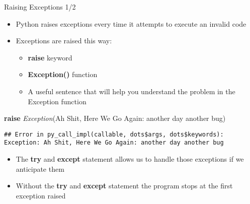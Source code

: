 \documentclass[
  8pt,
  ignorenonframetext,
]{beamer}
\newenvironment{Shaded}{\begin{snugshade}}{\end{snugshade}}
\newcommand{\ControlFlowTok}[1]{\textcolor[rgb]{0.13,0.29,0.53}{\textbf{#1}}}
\newcommand{\NormalTok}[1]{#1}
\newcommand{\PreprocessorTok}[1]{\textcolor[rgb]{0.56,0.35,0.01}{\textit{#1}}}
\newcommand{\StringTok}[1]{\textcolor[rgb]{0.31,0.60,0.02}{#1}}
\providecommand{\tightlist}{%
  \setlength{\itemsep}{0pt}\setlength{\parskip}{0pt}}
\begin{document}
\begin{frame}[fragile]{Raising Exceptions 1/2}
\protect\hypertarget{raising-exceptions-12}{}
\begin{itemize}
\item
  Python raises exceptions every time it attempts to execute an invalid
  code
\item
  Exceptions are raised this way:

  \begin{itemize}
  \tightlist
  \item
    \textbf{raise} keyword
  \item
    \textbf{Exception()} function
  \item
    A useful sentence that will help you understand the problem in the
    Exception function
  \end{itemize}
\end{itemize}

\begin{Shaded}
\begin{Highlighting}[]
\ControlFlowTok{raise} \PreprocessorTok{Exception}\NormalTok{(}\StringTok{\textquotesingle{}Ah Shit, Here We Go Again: another day another bug\textquotesingle{}}\NormalTok{)}
\end{Highlighting}
\end{Shaded}

\begin{verbatim}
## Error in py_call_impl(callable, dots$args, dots$keywords): Exception: Ah Shit, Here We Go Again: another day another bug
\end{verbatim}

\begin{itemize}
\item
  The \textbf{try} and \textbf{except} statement allows us to handle
  those exceptions if we anticipate them
\item
  Without the \textbf{try} and \textbf{except} statement the program
  stops at the first exception raised
\end{itemize}
\end{frame}
\end{document}
